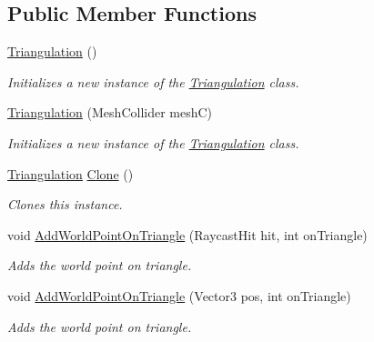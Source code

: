 \subsection*{Public Member Functions}
\begin{DoxyCompactItemize}
\item 
\hyperlink{class_lerp2_a_p_i_1_1_utility_1_1_c_s_g_1_1_triangulation_ae95f3bccaee928c0998daf4c48144f6d}{Triangulation} ()
\begin{DoxyCompactList}\small\item\em Initializes a new instance of the \hyperlink{class_lerp2_a_p_i_1_1_utility_1_1_c_s_g_1_1_triangulation}{Triangulation} class. \end{DoxyCompactList}\item 
\hyperlink{class_lerp2_a_p_i_1_1_utility_1_1_c_s_g_1_1_triangulation_a5c67baabfc481e4b6bc672863c4f91ee}{Triangulation} (Mesh\+Collider meshC)
\begin{DoxyCompactList}\small\item\em Initializes a new instance of the \hyperlink{class_lerp2_a_p_i_1_1_utility_1_1_c_s_g_1_1_triangulation}{Triangulation} class. \end{DoxyCompactList}\item 
\hyperlink{class_lerp2_a_p_i_1_1_utility_1_1_c_s_g_1_1_triangulation}{Triangulation} \hyperlink{class_lerp2_a_p_i_1_1_utility_1_1_c_s_g_1_1_triangulation_ad822873b0657386d4bb0653cdc48c221}{Clone} ()
\begin{DoxyCompactList}\small\item\em Clones this instance. \end{DoxyCompactList}\item 
void \hyperlink{class_lerp2_a_p_i_1_1_utility_1_1_c_s_g_1_1_triangulation_a73f6a79bc7d40d0e4323bd2303724e7d}{Add\+World\+Point\+On\+Triangle} (Raycast\+Hit hit, int on\+Triangle)
\begin{DoxyCompactList}\small\item\em Adds the world point on triangle. \end{DoxyCompactList}\item 
void \hyperlink{class_lerp2_a_p_i_1_1_utility_1_1_c_s_g_1_1_triangulation_af4b957c6e7f284eae13533a4446da28a}{Add\+World\+Point\+On\+Triangle} (Vector3 pos, int on\+Triangle)
\begin{DoxyCompactList}\small\item\em Adds the world point on triangle. \end{DoxyCompactList}\item 

\end{DoxyCompactItemize}

